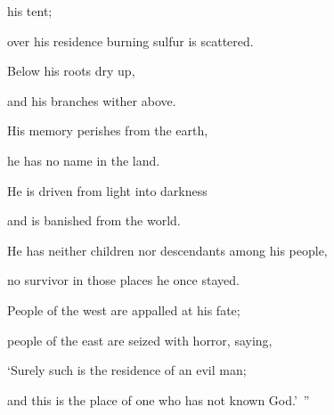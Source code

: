{his tent;
\par }{\Q over
his residence burning sulfur
is scattered.
\par }{\Q {}Below
his roots
dry
up,
\par }{\Q and his branches
wither
above.
\par }{\Q {}His memory
perishes
from
the earth,
\par }{\Q he has no
name
in
the land.
\par }{\Q {}He is driven
from light
into darkness
\par }{\Q and is banished
from the world.
\par }{\Q {}He has neither
children
nor
descendants
among his people,
\par }{\Q no
survivor
in those places he once stayed.
\par }{\Q {}People of the west
are appalled
at his fate;
\par }{\Q people of the east
are seized
with horror, saying,
\par }{\Q {}‘Surely
such
is the residence
of an evil man;
\par }{\Q and this
is the place
of one who has not
known
God.’ ”


\par }
